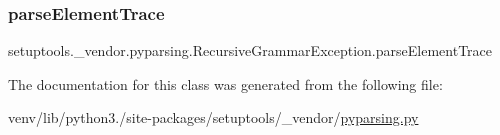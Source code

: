 \subsubsection{\texorpdfstring{parse\+Element\+Trace}{parseElementTrace}}
{\footnotesize\ttfamily setuptools.\+\_\+vendor.\+pyparsing.\+Recursive\+Grammar\+Exception.\+parse\+Element\+Trace}



The documentation for this class was generated from the following file\+:\begin{DoxyCompactItemize}
\item 
venv/lib/python3./site-\/packages/setuptools/\+\_\+vendor/\hyperlink{setuptools_2__vendor_2pyparsing_8py}{pyparsing.\+py}\end{DoxyCompactItemize}
